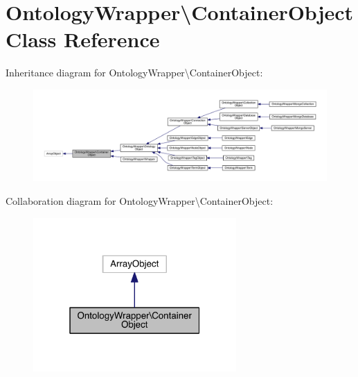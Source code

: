 \hypertarget{class_ontology_wrapper_1_1_container_object}{\section{Ontology\-Wrapper\textbackslash{}Container\-Object Class Reference}
\label{class_ontology_wrapper_1_1_container_object}
}


Inheritance diagram for Ontology\-Wrapper\textbackslash{}Container\-Object\-:
\nopagebreak
\begin{figure}[H]
\begin{center}
\leavevmode
\includegraphics[width=350pt]{class_ontology_wrapper_1_1_container_object__inherit__graph}
\end{center}
\end{figure}


Collaboration diagram for Ontology\-Wrapper\textbackslash{}Container\-Object\-:
\nopagebreak
\begin{figure}[H]
\begin{center}
\leavevmode
\includegraphics[width=220pt]{class_ontology_wrapper_1_1_container_object__coll__graph}
\end{center}
\end{figure}
